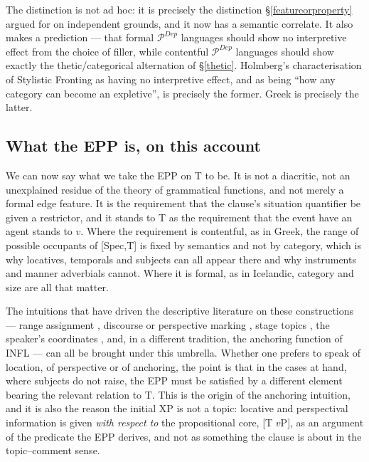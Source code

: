 \documentclass[11pt]{article}
\newcommand{\Pd}{{$\mathcal{P}^{Dep}$}\xspace}
\begin{document}
\medskip
The distinction is not ad hoc: it is precisely the distinction \S\ref{featureorproperty} argued for on independent grounds, and it now has a semantic correlate.  It also makes a prediction --- that formal \Pd{} languages should show no interpretive effect from the choice of filler, while contentful \Pd{} languages should show exactly the thetic/categorical alternation of \S\ref{thetic}.  Holmberg's characterisation of Stylistic Fronting as having no interpretive effect, and as being ``how any category can become an expletive'', is precisely the former.  Greek is precisely the latter.

\subsection{What the EPP is, on this account}

We can now say what we take the EPP on T to be.  It is not a diacritic, not an unexplained residue of the theory of grammatical functions, and not merely a formal edge feature.  It is the requirement that the clause's situation quantifier be given a restrictor, and it stands to T as the requirement that the event have an agent stands to $v$.  Where the requirement is contentful, as in Greek, the range of possible occupants of [Spec,T] is fixed by semantics and not by category, which is why locatives, temporals and subjects can all appear there and why instruments and manner adverbials cannot.  Where it is formal, as in Icelandic, category and size are all that matter.

The intuitions that have driven the descriptive literature on these constructions --- range assignment \citep{Borer:05a}, discourse or perspective marking \citep{alexiadou:11b, partee-borschev:04}, stage topics \citep{basilico:03, cohen-erteschik-shir:02}, the speaker's coordinates \citep{giorgi:10}, and, in a different tradition, the anchoring function of INFL \citep{ritter-wiltschko:14, wiltschko:14} --- can all be brought under this umbrella.  Whether one prefers to speak of location, of perspective or of anchoring, the point is that in the cases at hand, where subjects do not raise, the EPP must be satisfied by a different element bearing the relevant relation to T.  This is the origin of the anchoring intuition, and it is also the reason the initial XP is not a topic: locative and perspectival information is given \emph{with respect to} the propositional core, [T $v$P], as an argument of the predicate the EPP derives, and not as something the clause is about in the topic--comment sense.
\end{document}
